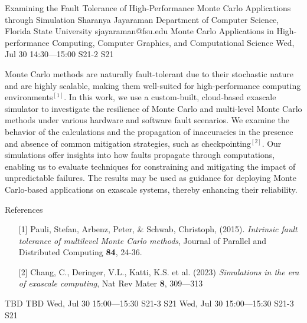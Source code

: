 \begin{talk}
  {Examining the Fault Tolerance of High-Performance Monte Carlo Applications through Simulation}%
  {Sharanya Jayaraman}%
  {Department of Computer Science, Florida State University}%
  {sjayaraman@fsu.edu}%
  {Monte Carlo Applications in High-performance Computing, Computer Graphics, and Computational Science}%
  {}%
  {Wed, Jul 30 14:30---15:00}%
  {S21-2}%
  {S21}%
   
Monte Carlo methods are naturally fault-tolerant due to their stochastic nature and are highly scalable, making them well-suited for high-performance computing environments$^{[1]}$. In this work, we use a custom-built, cloud-based exascale simulator to investigate the resilience of Monte Carlo and multi-level Monte Carlo methods under various hardware and software fault scenarios. We examine the behavior of the calculations and the propagation of inaccuracies in the presence and absence of common mitigation strategies, such as checkpointing$^{[2]}$. Our simulations offer insights into how faults propagate through computations, enabling us to evaluate techniques for constraining and mitigating the impact of unpredictable failures. The results may be used as guidance for deploying Monte Carlo-based applications on exascale systems, thereby enhancing their reliability.

\medskip

References
\begin{enumerate}
 \item[{[1]}] Pauli, Stefan, Arbenz, Peter, \&  Schwab, Christoph, (2015). {\it Intrinsic fault tolerance of multilevel Monte Carlo methods}, Journal of Parallel and Distributed Computing \textbf{84}, 24-36.
 \item[{[2]}] Chang, C., Deringer, V.L., Katti, K.S. et al. (2023) {\it Simulations in the era of exascale computing}, Nat Rev Mater \textbf{8}, 309---313 
\end{enumerate}

\end{talk}

\begin{talk}
  {TBD}%
  {TBD}%
  {Wed, Jul 30 15:00---15:30}%
  {S21-3}%
  {S21}%
  {}%
  {Wed, Jul 30 15:00---15:30}%
  {S21-3}%
  {S21}%
\end{talk}

